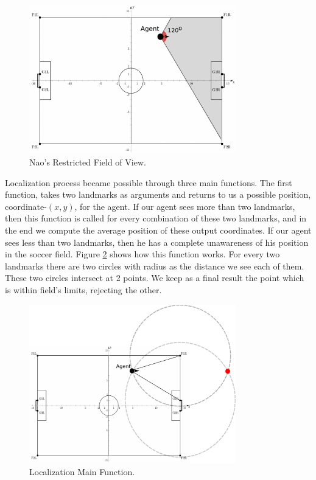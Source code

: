 \begin{figure}[t!]
\centering
  \includegraphics[width=0.8\textwidth]{Chapter3/figures/LViewAngle.pdf}
  \caption{Nao's Restricted Field of View.} 
  \label{fig:fieldofview}
\end{figure}
 
Localization process became possible through three main functions. The first function, takes two landmarks as arguments and returns to us a possible position, coordinate-$(x,y)$, for the agent. If our agent sees more than two landmarks, then this function is called for every combination of these two landmarks, and in the end we compute the average position of these output coordinates. If our agent sees less than two landmarks, then he has a complete unawareness of his position in the soccer field. Figure \ref{fig:Localization} shows how this function works. For every two landmarks there are two circles with radius as the distance we see each of them. These two circles intersect at 2 points. We keep as a final result the point which is within field's limits, rejecting the other.

\begin{figure}[t!]
\centering
  \includegraphics[width=0.8\textwidth]{Chapter3/figures/Localization.pdf}
  \caption{Localization Main Function.} 
  \label{fig:Localization}
\end{figure}

